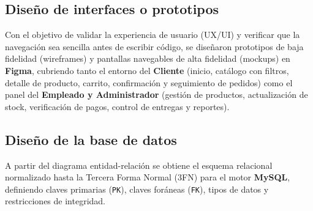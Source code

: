 \subsection{Diseño de interfaces o prototipos}
Con el objetivo de validar la experiencia de usuario (UX/UI) y verificar que la navegación sea sencilla antes de escribir código, se diseñaron prototipos de baja fidelidad (wireframes) y pantallas navegables de alta fidelidad (mockups) en \textbf{Figma}, cubriendo tanto el entorno del \textbf{Cliente} (inicio, catálogo con filtros, detalle de producto, carrito, confirmación y seguimiento de pedidos) como el panel del \textbf{Empleado y Administrador} (gestión de productos, actualización de stock, verificación de pagos, control de entregas y reportes).


\subsection{Diseño de la base de datos}
A partir del diagrama entidad-relación se obtiene el esquema relacional normalizado hasta la Tercera Forma Normal (3FN) para el motor \textbf{MySQL}, definiendo claves primarias (\texttt{PK}), claves foráneas (\texttt{FK}), tipos de datos y restricciones de integridad.


